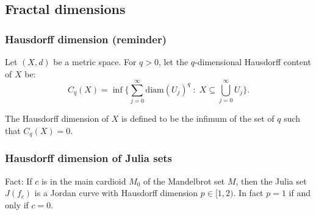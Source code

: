 \documentclass{beamer} %
\theoremstyle{definition} %
\newcommand{\Rl}{\mathbb{R}}
\begin{document}
\subsection{Fractal dimensions}
\begin{frame}\frametitle{Hausdorff dimension (reminder)}
    Let $(X,d)$ be a metric space. For $q > 0$, let the $q$-dimensional Hausdorff content of $X$ be:
    \begin{equation*}
        C_q(X) = \inf\{\sum_{j=0}^\infty \mathrm{diam}(U_j)^q\;:\;X \subseteq \bigcup_{j =0}^\infty U_j\}.
    \end{equation*}
    
    The Hausdorff dimension of $X$ is defined to be the infimum of the set of $q$ such that $C_q(X) = 0$.
\end{frame}
% 

\begin{frame}\frametitle{Hausdorff dimension of Julia sets}
    Fact: If $c$ is in the main cardioid $M_0$ of the Mandelbrot set $M$, then the Julia set $J(f_c)$ is a Jordan curve
    with Hausdorff dimension $p \in [1,2)$. In fact $p = 1$ if and only if $c = 0$.
\end{frame}

%     
\end{document}
